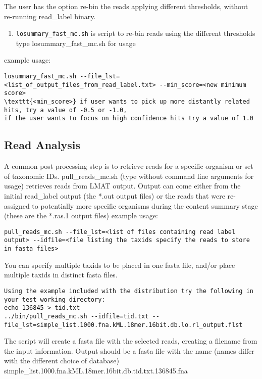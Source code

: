 \documentclass[11pt]{article}
\begin{document}
The user has the option re-bin the reads applying different thresholds, without re-running read_label binary. 
\begin{enumerate}
\item
\texttt{losummary_fast_mc.sh} is script to re-bin reads using the different thresholds
type losummary_fast_mc.sh for usage
\end{enumerate}
example usage: 
\begin{verbatim}
losummary_fast_mc.sh --file_lst=<list_of_output_files_from_read_label.txt> --min_score=<new minimum score>
\texttt{<min_score>} if user wants to pick up more distantly related hits, try a value of -0.5 or -1.0,
if the user wants to focus on high confidence hits try a value of 1.0

\end{verbatim}

\subsection{Read Analysis}
A common post processing step is to retrieve reads for a specific organism or set of taxonomic IDs.
pull\_reads\_mc.sh (type without command line arguments for usage) retrieves reads from LMAT output.
Output can come either from the initial read_label output (the *.out output files) or the reads that
were re-assigned to potentially more specific organisms during the content summary stage (these are the *.ras.1 
output files)
example usage:
\begin{verbatim}
pull_reads_mc.sh --file_lst=<list of files containing read label output> --idfile=<file listing the taxids specify the reads to store in fasta files>
\end{verbatim}
You can specify multiple taxids to be placed in one fasta file, and/or place multiple taxids in distinct fasta files. 

\begin{verbatim}
Using the example included with the distribution try the following in your test working directory:
echo 136845 > tid.txt
../bin/pull_reads_mc.sh --idfile=tid.txt --file_lst=simple_list.1000.fna.kML.18mer.16bit.db.lo.rl_output.flst
\end{verbatim}

The script will create a fasta file with the selected reads, creating a filename from the input information. Output should be a fasta file with the name (names differ with the different choice of database)
simple_list.1000.fna.kML.18mer.16bit.db.tid.txt.136845.fna
\end{document}
